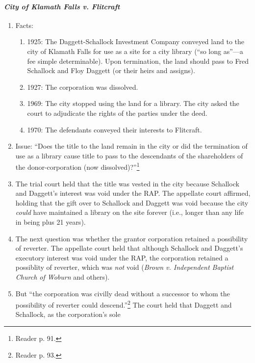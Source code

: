 \paragraph{\emph{City of Klamath Falls v. Flitcraft}}

\begin{enumerate}
    \item Facts:
    \begin{enumerate}
        \item 1925: The Daggett-Schallock Investment Company conveyed land to 
        the city of Klamath Falls for use as a site for a city library (``so 
        long as''---a fee simple determinable). Upon termination, the land 
        should pass to Fred Schallock and Floy Daggett (or their heirs and 
        assigns).
        \item 1927: The corporation was dissolved.
        \item 1969: The city stopped using the land for a library. The city 
        asked the court to adjudicate the rights of the parties under the 
        deed.
        \item 1970: The defendants conveyed their interests to Flitcraft.
    \end{enumerate}
    \item Issue: ``Does the title to the land remain in the city or did the 
    termination of use as a library cause title to pass to the descendants of 
    the shareholders of the donor-corporation (now 
    dissolved)?''\footnote{Reader p. 91.}
    \item The trial court held that the title was vested in the city because 
    Schallock and Daggett's interest was void under the RAP. The appellate 
    court affirmed, holding that the gift over to Schallock and Daggett was 
    void because the city \emph{could} have maintained a library on the site 
    forever (i.e., longer than any life in being plus 21 years).
    \item The next question was whether the grantor corporation retained a 
    possibility of reverter. The appellate court held that although Schallock 
    and Daggett's executory interest was void under the RAP, the corporation 
    retained a possiblity of reverter, which was \emph{not} void (\emph{Brown 
    v. Independent Baptist Church of Woburn} and others).
    \item But ``the corporation was civilly dead without a successor to whom 
    the possibility of reverter could descend.''\footnote{Reader p. 93.} The 
    court held that Daggett and Schallock, as the corporation's sole 

\end{enumerate}
